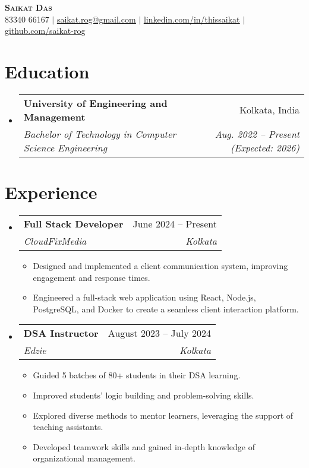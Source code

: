 \documentclass[letterpaper,11pt]{article}
\makeatletter
\newcommand{\resumeItem}[1]{
  \item\small{
    {#1 \vspace{-2pt}}
  }
}
\newcommand{\resumeSubheading}[4]{
  \vspace{-2pt}\item
    \begin{tabular*}{0.97\textwidth}[t]{l@{\extracolsep{\fill}}r}
      \textbf{#1} & #2 \\
      \textit{\small#3} & \textit{\small #4} \\
    \end{tabular*}\vspace{-7pt}
}
\newcommand{\resumeSubHeadingListStart}{\begin{itemize}[leftmargin=0.15in, label={}]}
\newcommand{\resumeSubHeadingListEnd}{\end{itemize}}
\newcommand{\resumeItemListStart}{\begin{itemize}}
\newcommand{\resumeItemListEnd}{\end{itemize}\vspace{-5pt}}
\makeatother
\begin{document}
\begin{center}
    \textbf{\Huge \scshape Saikat Das} \\ \vspace{1pt}
    \small 83340 66167 $|$ \href{mailto:saikat.rog@gmail.com}{\underline{saikat.rog@gmail.com}} $|$ 
    \href{https://www.linkedin.com/in/thissaikat/}{\underline{linkedin.com/in/thissaikat}} $|$
    \href{https://github.com/saikat-rog}{\underline{github.com/saikat-rog}}
\end{center}

\section{Education}
  \resumeSubHeadingListStart
    \resumeSubheading
      {University of Engineering and Management}{Kolkata, India}
      {Bachelor of Technology in Computer Science Engineering}{Aug. 2022 -- Present (Expected: 2026)}
  \resumeSubHeadingListEnd

\section{Experience}
  \resumeSubHeadingListStart
    \resumeSubheading
      {Full Stack Developer}{June 2024 -- Present}
      {CloudFixMedia}{Kolkata}
      \resumeItemListStart
        \resumeItem{Designed and implemented a client communication system, improving engagement and response times.}
        \resumeItem{Engineered a full-stack web application using React, Node.js, PostgreSQL, and Docker to create a seamless client interaction platform.}
      \resumeItemListEnd

    \resumeSubheading
      {DSA Instructor}{August 2023 -- July 2024}
      {Edzie}{Kolkata}
      \resumeItemListStart
        \resumeItem{Guided 5 batches of 80+ students in their DSA learning.}
        \resumeItem{Improved students' logic building and problem-solving skills.}
        \resumeItem{Explored diverse methods to mentor learners, leveraging the support of teaching assistants.}
        \resumeItem{Developed teamwork skills and gained in-depth knowledge of organizational management.}
      \resumeItemListEnd

  \resumeSubHeadingListEnd

\end{document}
